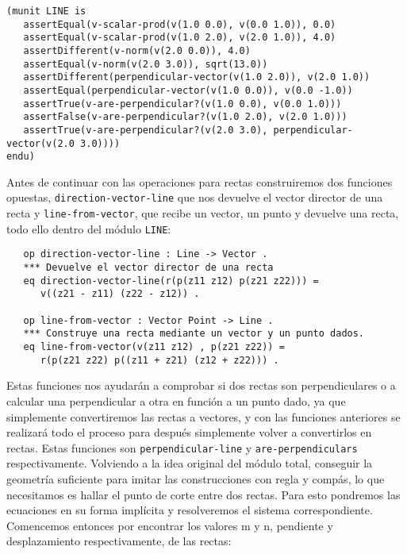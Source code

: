 {\codesize
\begin{verbatim}
(munit LINE is
   assertEqual(v-scalar-prod(v(1.0 0.0), v(0.0 1.0)), 0.0)
   assertEqual(v-scalar-prod(v(1.0 2.0), v(2.0 1.0)), 4.0)	
   assertDifferent(v-norm(v(2.0 0.0)), 4.0)
   assertEqual(v-norm(v(2.0 3.0)), sqrt(13.0))
   assertDifferent(perpendicular-vector(v(1.0 2.0)), v(2.0 1.0))
   assertEqual(perpendicular-vector(v(1.0 0.0)), v(0.0 -1.0))
   assertTrue(v-are-perpendicular?(v(1.0 0.0), v(0.0 1.0)))
   assertFalse(v-are-perpendicular?(v(1.0 2.0), v(2.0 1.0)))
   assertTrue(v-are-perpendicular?(v(2.0 3.0), perpendicular-vector(v(2.0 3.0))))
endu)
\end{verbatim}
}

Antes de continuar con las operaciones para rectas construiremos dos funciones opuestas, \texttt{direction-vector-line} que nos devuelve el vector director de una recta y \texttt{line-from-vector}, que recibe un vector, un punto y devuelve una recta, todo ello dentro del módulo \texttt{LINE}: \par
{\codesize
\begin{verbatim}
   op direction-vector-line : Line -> Vector .
   *** Devuelve el vector director de una recta
   eq direction-vector-line(r(p(z11 z12) p(z21 z22))) =
      v((z21 - z11) (z22 - z12)) .

   op line-from-vector : Vector Point -> Line .
   *** Construye una recta mediante un vector y un punto dados.
   eq line-from-vector(v(z11 z12) , p(z21 z22)) =
      r(p(z21 z22) p((z11 + z21) (z12 + z22))) .
\end{verbatim}
}

Estas funciones nos ayudarán a comprobar si dos rectas son perpendiculares o a calcular una perpendicular a otra en función a un punto dado, ya que simplemente convertiremos las rectas a vectores, y con las funciones anteriores se realizará todo el proceso para después simplemente volver a convertirlos en rectas. Estas funciones son \texttt{perpendicular-line} y \texttt{are-perpendiculars} respectivamente. Volviendo a la idea original del módulo total, conseguir la geometría suficiente para imitar las construcciones con regla y compás, lo que necesitamos es hallar el punto de corte entre dos rectas. Para esto pondremos las ecuaciones en su forma implícita y resolveremos el sistema correspondiente. Comencemos entonces por encontrar los valores m y n, pendiente y desplazamiento respectivamente, de las rectas: \par

